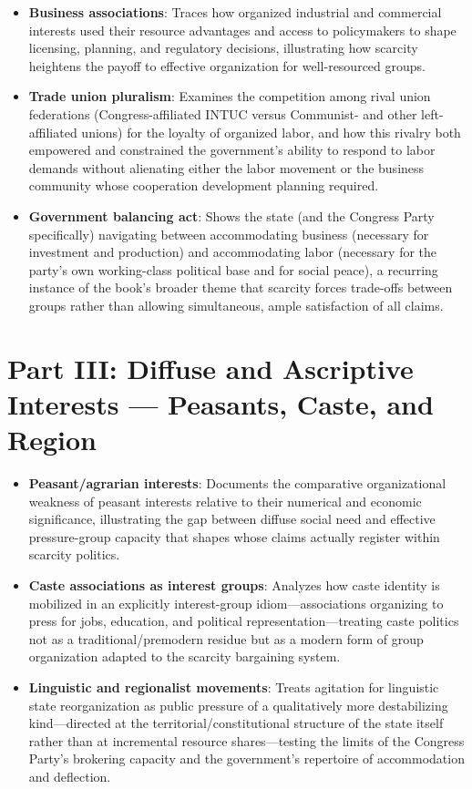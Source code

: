 \documentclass[12pt]{article}
\begin{document}
\begin{itemize}[leftmargin=*, itemsep=4pt]
    \item \textbf{Business associations}: Traces how organized industrial and commercial interests used their resource advantages and access to policymakers to shape licensing, planning, and regulatory decisions, illustrating how scarcity heightens the payoff to effective organization for well-resourced groups.
    \item \textbf{Trade union pluralism}: Examines the competition among rival union federations (Congress-affiliated INTUC versus Communist- and other left-affiliated unions) for the loyalty of organized labor, and how this rivalry both empowered and constrained the government's ability to respond to labor demands without alienating either the labor movement or the business community whose cooperation development planning required.
    \item \textbf{Government balancing act}: Shows the state (and the Congress Party specifically) navigating between accommodating business (necessary for investment and production) and accommodating labor (necessary for the party's own working-class political base and for social peace), a recurring instance of the book's broader theme that scarcity forces trade-offs between groups rather than allowing simultaneous, ample satisfaction of all claims.
\end{itemize}

\section{Part III: Diffuse and Ascriptive Interests --- Peasants, Caste, and Region}

\begin{itemize}[leftmargin=*, itemsep=4pt]
    \item \textbf{Peasant/agrarian interests}: Documents the comparative organizational weakness of peasant interests relative to their numerical and economic significance, illustrating the gap between diffuse social need and effective pressure-group capacity that shapes whose claims actually register within scarcity politics.
    \item \textbf{Caste associations as interest groups}: Analyzes how caste identity is mobilized in an explicitly interest-group idiom---associations organizing to press for jobs, education, and political representation---treating caste politics not as a traditional/premodern residue but as a modern form of group organization adapted to the scarcity bargaining system.
    \item \textbf{Linguistic and regionalist movements}: Treats agitation for linguistic state reorganization as public pressure of a qualitatively more destabilizing kind---directed at the territorial/constitutional structure of the state itself rather than at incremental resource shares---testing the limits of the Congress Party's brokering capacity and the government's repertoire of accommodation and deflection.
\end{itemize}
\end{document}
